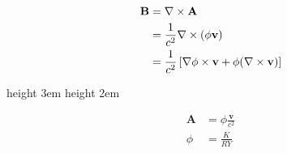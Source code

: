\documentclass[11pt,a4paper]{article}
\begin{document}
\begin{minipage}[c]{0.70\textwidth}                                                                                               
\begin{align}
    \mathbf{B} &= \nabla \times \mathbf{A} \notag \\
               &= \frac{1}{c^2} \nabla \times (\phi \mathbf{v}) \notag \\
               &= \frac{1}{c^2} \left[\nabla \phi \times \mathbf{v} + \phi (\nabla \times \mathbf{v}) \right] \label{eq41}
\end{align}                                                                                                                       
\end{minipage}                                                                                                                    
\hspace{0.5em}\vrule height 3em \hspace{0.02em} \vrule height 2em \hspace{1em}                                                    
\begin{minipage}[c]{0.18\textwidth}                                                                                               
\begin{align*}                                                                                                                    
    \mathbf{A} &= \phi \frac{\mathbf{v}}{c^2} \\
    \phi &= \frac{K}{RY}
\end{align*}                                                                                                                      
\end{minipage} 
\\
\end{document}
